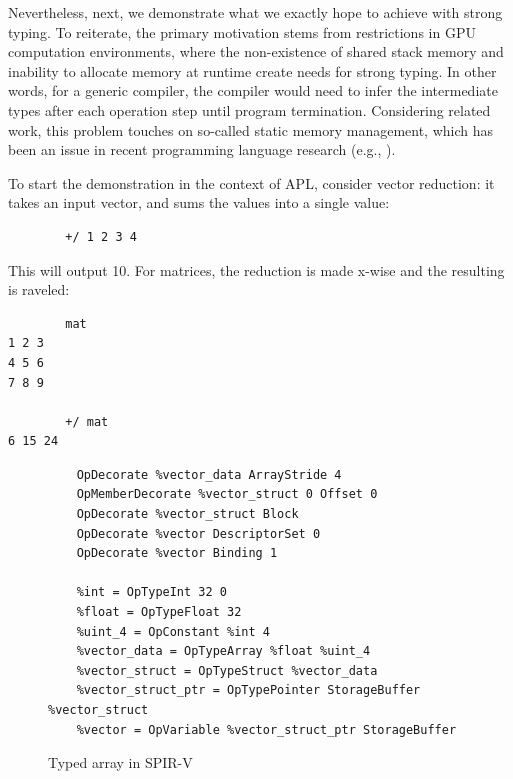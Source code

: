 \documentclass{report}
\begin{document}
Nevertheless, next, we demonstrate what we exactly hope to achieve with strong typing. To reiterate, the primary motivation stems from restrictions in GPU computation environments, where the non-existence of shared stack memory and inability to allocate memory at runtime create needs for strong typing. In other words, for a generic compiler, the compiler would need to infer the intermediate types after each operation step until program termination. Considering related work, this problem touches on so-called static memory management, which has been an issue in recent programming language research (e.g., \cite{proust2017asap}).

To start the demonstration in the context of APL, consider vector reduction: it takes an input vector, and sums the values into a single value:

\begin{verbatim}
        +/ 1 2 3 4
\end{verbatim}

This will output 10. For matrices, the reduction is made x-wise and the resulting is raveled:

\begin{verbatim}
        mat
1 2 3
4 5 6
7 8 9
        
        +/ mat
6 15 24
\end{verbatim}

\begin{figure}
    \begin{lstlisting}
    OpDecorate %vector_data ArrayStride 4
    OpMemberDecorate %vector_struct 0 Offset 0
    OpDecorate %vector_struct Block
    OpDecorate %vector DescriptorSet 0
    OpDecorate %vector Binding 1
    
    %int = OpTypeInt 32 0
    %float = OpTypeFloat 32
    %uint_4 = OpConstant %int 4
    %vector_data = OpTypeArray %float %uint_4
    %vector_struct = OpTypeStruct %vector_data
    %vector_struct_ptr = OpTypePointer StorageBuffer %vector_struct
    %vector = OpVariable %vector_struct_ptr StorageBuffer
    \end{lstlisting}
    \caption{Typed array in SPIR-V}
    \label{fig:typedspirv}
\end{figure}
\end{document}
